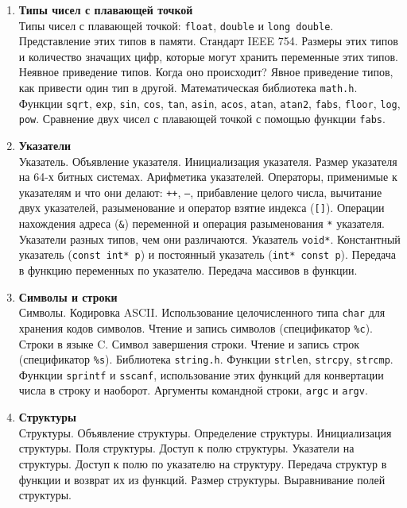 \documentclass{article}
\begin{document}
\begin{enumerate}
\item \textbf{Типы чисел с плавающей точкой}\\
Типы чисел с плавающей точкой: \texttt{float}, \texttt{double} и \texttt{long double}. Представление этих типов в памяти. Стандарт IEEE 754. Размеры этих типов и количество значащих цифр, которые могут хранить переменные этих типов. Неявное приведение типов. Когда оно происходит? Явное приведение типов, как привести один тип в другой.   Математическая библиотека \texttt{math.h}. Функции \texttt{sqrt}, \texttt{exp}, \texttt{sin}, \texttt{cos}, \texttt{tan}, \texttt{asin}, \texttt{acos}, \texttt{atan}, \texttt{atan2}, \texttt{fabs}, \texttt{floor}, \texttt{log}, \texttt{pow}. Сравнение двух чисел с плавающей точкой с помощью функции \texttt{fabs}.

\item \textbf{Указатели}\\
Указатель. Объявление указателя. Инициализация указателя. Размер указателя на 64-х битных системах. Арифметика указателей. Операторы, применимые к указателям и что они делают: \texttt{++}, \texttt{--}, прибавление целого числа, вычитание двух указателей, разыменование и оператор взятие индекса (\texttt{[]}). Операции нахождения адреса (\texttt{\&}) переменной и операция разыменования \texttt{*} указателя. Указатели разных типов, чем они различаются. Указатель \texttt{void*}. Константный указатель (\texttt{const int* p}) и постоянный указатель (\texttt{int* const p}). Передача в функцию переменных по указателю. Передача массивов в функции.

\item \textbf{Символы и строки}\\
Символы. Кодировка ASCII. Использование целочисленного типа \texttt{char} для хранения кодов символов. Чтение и запись символов (спецификатор \texttt{\%с}). Строки в языке C. Символ завершения строки. Чтение и запись строк (спецификатор \texttt{\%s}). Библиотека \texttt{string.h}. Функции \texttt{strlen}, \texttt{strcpy}, \texttt{strcmp}. Функции \texttt{sprintf} и \texttt{sscanf}, использование этих функций для конвертации числа в строку и наоборот. Аргументы командной строки, \texttt{argc} и \texttt{argv}.

\item \textbf{Структуры}\\
Структуры. Объявление структуры. Определение структуры. Инициализация структуры. Поля структуры. Доступ к полю структуры. Указатели на структуры. Доступ к полю по указателю на структуру. Передача структур в функции и возврат их из функций. Размер структуры. Выравнивание полей структуры.


\end{enumerate}
\end{document}
